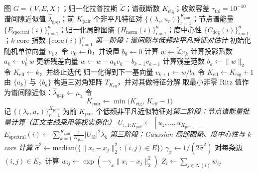 \begin{algorithm}[htbp]
\caption{图复杂度指标预处理（含谱估计、节点谱能量与局部图熵批量计算）}
\label{alg:ch3-preprocess}
\begin{algorithmic}[1]
\setlength{\algorithmicindent}{2em}
\REQUIRE 图 $G=(V,E,X)$；归一化拉普拉斯 $\tilde{\mathcal{L}}$；谱截断数 $K_{\text{eig}}$；收敛容差 $\tau_{\text{tol}}=10^{-10}$
\ENSURE 谱间隙近似值 $\hat{\lambda}_{\text{gap}}$；前 $K_{\text{pair}}$ 个非平凡特征对 $\{(\lambda_r,u_r)\}_{r=1}^{K_{\text{pair}}}$；节点谱能量 $\{E_{\text{spectral}}(i)\}_{i=1}^n$；归一化局部图熵 $\{H_{\text{norm}}(i)\}_{i=1}^n$；度中心性 $\{C_{\text{deg}}(i)\}_{i=1}^n$；$k$-core 指数 $\{\mathrm{core}(i)\}_{i=1}^n$
\STATE \textit{第一阶段：谱间隙与低频非平凡特征对估计}
\STATE 初始化随机单位向量 $v_1$，令 $v_0\leftarrow \mathbf{0}$，并设置 $b_0\leftarrow 0$
  \STATE 计算 $w \leftarrow \tilde{\mathcal{L}}v_k$
  \STATE 计算投影系数 $a_k \leftarrow v_k^\top w$
  \STATE 更新残差向量 $w \leftarrow w-a_kv_k-b_{k-1}v_{k-1}$
  \STATE 计算残差范数 $b_k \leftarrow \|w\|_2$
    \STATE 令 $K_{\text{eff}}\leftarrow k$，并终止迭代
  \ELSE
    \STATE 归一化得到下一基向量 $v_{k+1}\leftarrow w/b_k$
  \ENDIF
\ENDFOR
{}
  \STATE 令 $K_{\text{eff}}\leftarrow K_{\text{eig}}+1$
\ENDIF
\STATE 由 $\{a_k\}$ 与 $\{b_k\}$ 构造三对角矩阵 $T_{K_{\text{eff}}}$，并对其做特征分解
\STATE 取最小非零 Ritz 值作为谱间隙近似：$\hat{\lambda}_{\text{gap}}\leftarrow \mu_1$
\STATE 令
{\setlength{\abovedisplayskip}{2pt}
 \setlength{\belowdisplayskip}{2pt}
 \setlength{\abovedisplayshortskip}{2pt}
 \setlength{\belowdisplayshortskip}{2pt}
\[
K_{\text{pair}} \leftarrow \min\!\bigl(K_{\text{eig}},\,K_{\text{eff}}-1\bigr)
\]
}
\STATE 记 $\{(\lambda_r,u_r)\}_{r=1}^{K_{\text{pair}}}$ 为前 $K_{\text{pair}}$ 个低频非平凡近似特征对\STATE \textit{第二阶段：节点谱能量批量计算（正文主线采用等权实例化）}
\STATE $U_{:,1:K_{\text{pair}}} \leftarrow [u_1,\ldots,u_{K_{\text{pair}}}]$
  \STATE $E_{\text{spectral}}(i) \leftarrow \sum_{k=1}^{K_{\text{pair}}} \frac{1}{K_{\text{pair}}}|U_{ik}|^2\lambda_k$
\ENDFOR
\STATE \textit{第三阶段：Gaussian 局部图熵、度中心性与 $k$-core 计算}
\STATE $\hat{\sigma}^2 \leftarrow \mathrm{median}\!\bigl(\{\|x_i-x_j\|_2^2:(i,j)\in E\}\bigr)$
\STATE $\gamma_x \leftarrow 1/(2\hat{\sigma}^2)$
\STATE 对每条边 $(i,j)\in E$，计算 $w_{ij} \leftarrow \exp(-\gamma_x\|x_i-x_j\|_2^2)$
  \STATE $Z_i \leftarrow \sum_{j\in\mathcal{N}(i)} w_{ij}$

\end{algorithmic}
\end{algorithm}
